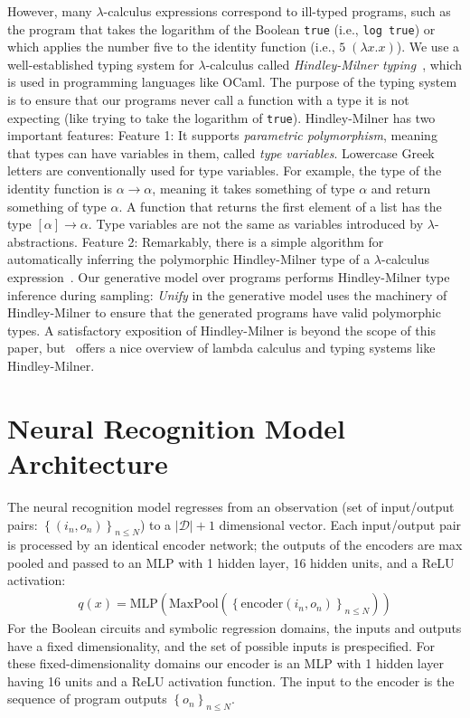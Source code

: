 \documentclass{article}
\begin{document}
However, many $\lambda$-calculus expressions correspond to ill-typed programs, such as the program that takes the logarithm of the Boolean \texttt{true} (i.e., \texttt{log true}) or which applies the number five to the identity function
(i.e., $5 \; (\lambda x.x)$).
We use a well-established typing system for $\lambda$-calculus called \emph{Hindley-Milner typing}~\cite{pierce}, which is used in programming languages like OCaml.
The purpose of the typing system is to ensure that our programs never call a function with a type it is not expecting (like trying to take the logarithm of \texttt{true}).
Hindley-Milner has two important features:
Feature 1: It supports \emph{parametric polymorphism}, meaning that types can have variables in them, called \emph{type variables}. Lowercase Greek letters are conventionally used for  type variables.
For example, the type of the identity function is $\alpha\to\alpha$, meaning it takes something of type $\alpha$ and return something of type $\alpha$. A function that returns the first element of a list has the type $[\alpha]\to\alpha$. Type variables are not the same as variables introduced by $\lambda$-abstractions.
Feature 2: Remarkably, there is a  simple algorithm for automatically inferring the polymorphic Hindley-Milner type of a $\lambda$-calculus expression~\cite{damas1982principal}.
Our generative model over programs performs Hindley-Milner type inference during sampling:
\emph{Unify} in the generative model uses the machinery of Hindley-Milner to
ensure that the generated programs have valid polymorphic types.
A satisfactory exposition of Hindley-Milner is beyond the scope of this paper,
but~\cite{pierce} offers a nice overview of lambda calculus and typing systems like Hindley-Milner.


\section{Neural Recognition Model Architecture}

The neural recognition model regresses from an observation (set of input/output pairs: $\left\{(i_n,o_n) \right\}_{n\leq N}$) to a $|\mathcal{D}| + 1$ dimensional vector. Each input/output pair is processed by an identical encoder network;
the outputs of the encoders are max pooled and passed to an MLP with 1 hidden layer, 16 hidden units, and a ReLU activation:
\begin{align}
  q(x) = \text{MLP}\left(\text{MaxPool}\left(\left\{\text{encoder}\left(i_n,o_n \right) \right\}_{n\leq N} \right) \right)
\end{align}
For the Boolean circuits and symbolic regression domains,
the inputs and outputs have a fixed dimensionality,
and the set of possible inputs is prespecified. For these fixed-dimensionality domains our encoder is an MLP with 1 hidden layer having 16  units and a ReLU activation function. The input to the encoder is
the sequence of program outputs $\left\{o_n \right\}_{n\leq N}$.
\end{document}
